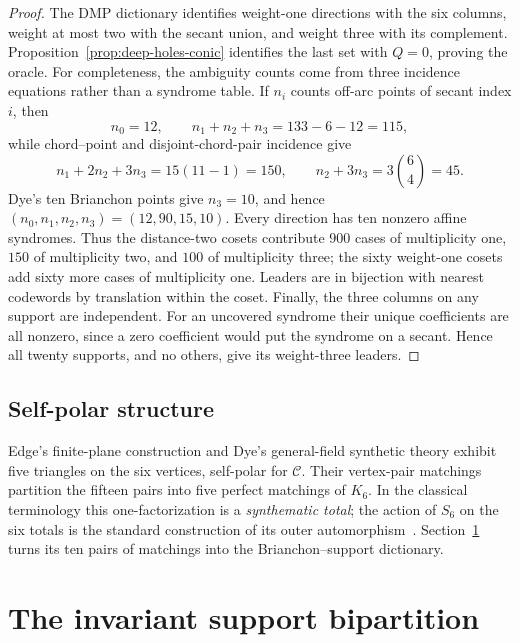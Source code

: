 \documentclass[11pt]{article}
\theoremstyle{definition}
\theoremstyle{remark}
\newcommand{\cC}{\mathcal{C}}
\begin{document}
\begin{proof}
The DMP dictionary identifies weight-one directions with the six columns,
weight at most two with the secant union, and weight three with its
complement.  Proposition~\ref{prop:deep-holes-conic} identifies the last
set with $Q=0$, proving the oracle.  For completeness, the ambiguity counts
come from three incidence equations rather than a syndrome table.  If
$n_i$ counts off-arc points of secant index $i$, then
\[
 n_0=12,\qquad n_1+n_2+n_3=133-6-12=115,
\]
while chord--point and disjoint-chord-pair incidence give
\[
 n_1+2n_2+3n_3=15(11-1)=150,
 \qquad n_2+3n_3=3\binom64=45.
\]
Dye's ten Brianchon points give $n_3=10$, and hence
$(n_0,n_1,n_2,n_3)=(12,90,15,10)$.
Every direction has
ten nonzero affine syndromes.  Thus the distance-two cosets contribute
$900$ cases of multiplicity one, $150$ of multiplicity two, and $100$ of
multiplicity three; the sixty weight-one cosets add sixty more cases of
multiplicity one.  Leaders are in bijection with nearest codewords by
translation within the coset.  Finally, the three columns on any support are independent.
For an uncovered syndrome their unique coefficients are all nonzero, since
a zero coefficient would put the syndrome on a secant.  Hence all twenty
supports, and no others, give its weight-three leaders.
\end{proof}

\subsection{Self-polar structure}
\label{sec:structural}

Edge's finite-plane construction
\cite[\S\S30.2--31]{Edge1956} and Dye's general-field synthetic theory
\cite[Theorem~2, pp.~277--278]{Dye1991} exhibit five triangles on the six
vertices, self-polar for $\cC$. Their vertex-pair matchings partition the
fifteen pairs into five perfect matchings of $K_6$. In the classical
terminology this one-factorization is a \emph{synthematic total}; the action
of $S_6$ on the six totals is the standard construction of its outer
automorphism~\cite{GillespieOCathainPraeger2018}.
Section~\ref{sec:support-bipartition}
turns its ten pairs of matchings into the Brianchon--support dictionary.

\section{The invariant support bipartition}
\label{sec:support-bipartition}
\end{document}
